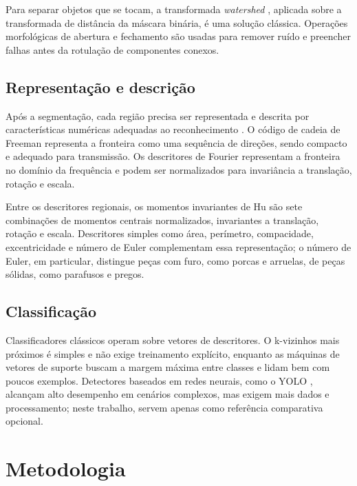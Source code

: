 \documentclass[12pt]{article}
\begin{document}
Para separar objetos que se tocam, a transformada \textit{watershed} \cite{vincent1991}, aplicada sobre a transformada de distância da máscara binária, é uma solução clássica. Operações morfológicas de abertura e fechamento são usadas para remover ruído e preencher falhas antes da rotulação de componentes conexos.

\subsection{Representação e descrição}

Após a segmentação, cada região precisa ser representada e descrita por características numéricas adequadas ao reconhecimento \cite{gonzalez2018}. O código de cadeia de Freeman \cite{freeman1961} representa a fronteira como uma sequência de direções, sendo compacto e adequado para transmissão. Os descritores de Fourier \cite{zahn1972} representam a fronteira no domínio da frequência e podem ser normalizados para invariância a translação, rotação e escala.

Entre os descritores regionais, os momentos invariantes de Hu \cite{hu1962} são sete combinações de momentos centrais normalizados, invariantes a translação, rotação e escala. Descritores simples como área, perímetro, compacidade, excentricidade e número de Euler complementam essa representação; o número de Euler, em particular, distingue peças com furo, como porcas e arruelas, de peças sólidas, como parafusos e pregos.

\subsection{Classificação}

Classificadores clássicos operam sobre vetores de descritores. O k-vizinhos mais próximos \cite{cover1967} é simples e não exige treinamento explícito, enquanto as máquinas de vetores de suporte \cite{cortes1995} buscam a margem máxima entre classes e lidam bem com poucos exemplos. Detectores baseados em redes neurais, como o YOLO \cite{redmon2016}, alcançam alto desempenho em cenários complexos, mas exigem mais dados e processamento; neste trabalho, servem apenas como referência comparativa opcional.

\section{Metodologia}
\label{sec:metodologia}
\end{document}
